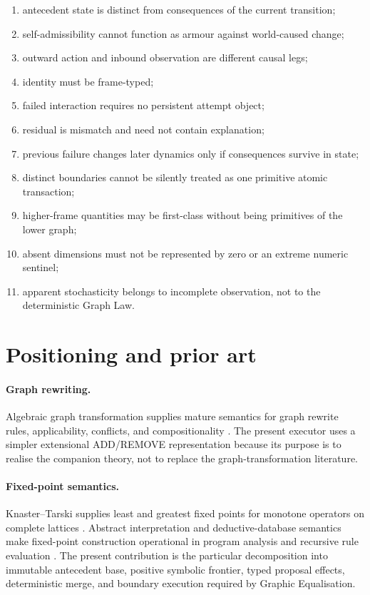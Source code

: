 \documentclass[11pt,a4paper]{article}
\theoremstyle{remark}
\begin{document}
\begin{enumerate}[leftmargin=*]
\item antecedent state is distinct from consequences of the current transition;
\item self-admissibility cannot function as armour against world-caused change;
\item outward action and inbound observation are different causal legs;
\item identity must be frame-typed;
\item failed interaction requires no persistent attempt object;
\item residual is mismatch and need not contain explanation;
\item previous failure changes later dynamics only if consequences survive in state;
\item distinct boundaries cannot be silently treated as one primitive atomic transaction;
\item higher-frame quantities may be first-class without being primitives of the lower graph;
\item absent dimensions must not be represented by zero or an extreme numeric sentinel;
\item apparent stochasticity belongs to incomplete observation, not to the deterministic Graph Law.
\end{enumerate}

\section{Positioning and prior art}\label{sec:prior-art}

\paragraph{Graph rewriting.}
Algebraic graph transformation supplies mature semantics for graph rewrite rules, applicability, conflicts, and compositionality \citep{corradini1997,ehrig2006}. The present executor uses a simpler extensional ADD/REMOVE representation because its purpose is to realise the companion theory, not to replace the graph-transformation literature.

\paragraph{Fixed-point semantics.}
Knaster--Tarski supplies least and greatest fixed points for monotone operators on complete lattices \citep{tarski1955}. Abstract interpretation and deductive-database semantics make fixed-point construction operational in program analysis and recursive rule evaluation \citep{cousot1977,ceri1989}. The present contribution is the particular decomposition into immutable antecedent base, positive symbolic frontier, typed proposal effects, deterministic merge, and boundary execution required by Graphic Equalisation.
\end{document}
